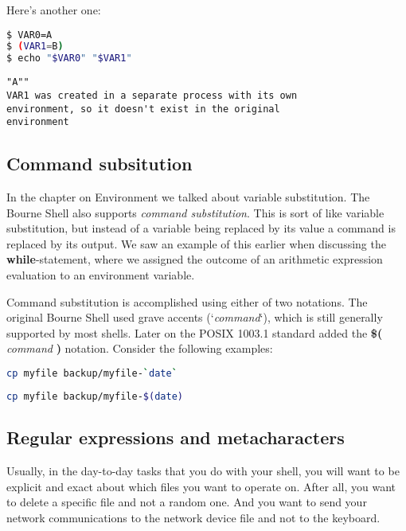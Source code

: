 Here's another one:
\lstset{basicstyle=\scriptsize, numbers=left, captionpos=b, tabsize=4}
\begin{lstlisting}[caption=Creating shell variables in the current and in a new environment,language={bash},
breaklines=true,xleftmargin=15pt,label=lst:Creating shell variables in the current and in a new environment]
$ VAR0=A
$ (VAR1=B)
$ echo "$VAR0" "$VAR1"
\end{lstlisting}

\scriptsize
\begin{verbatim}
"A""
VAR1 was created in a separate process with its own 
environment, so it doesn't exist in the original 
environment
\end{verbatim}
\normalsize

\subsection{Command subsitution}
In the chapter on Environment we talked about variable substitution. The Bourne
Shell also supports \emph{command substitution}. This is sort of like variable
substitution, but instead of a variable being replaced by its value a command
is replaced by its output. We saw an example of this earlier when discussing
the \textbf{while}-statement, where we assigned the outcome of an arithmetic
expression evaluation to an environment variable.

Command substitution is accomplished using either of two notations. The
original Bourne Shell used grave accents (`\emph{command}`), which is still
generally supported by most shells. Later on the POSIX 1003.1 standard added
the \textbf{\$(} \emph{command} \textbf{)} notation. Consider the following
examples:
\lstset{basicstyle=\scriptsize, numbers=left, captionpos=b, tabsize=4}
\begin{lstlisting}[caption=Making a daily backup (old-skool),language={bash},
breaklines=true,xleftmargin=15pt,label=lst:Making a daily backup (old-skool)]
cp myfile backup/myfile-`date`
\end{lstlisting}

\lstset{basicstyle=\scriptsize, numbers=left, captionpos=b, tabsize=4}
\begin{lstlisting}[caption=Making a daily backup (POSIX 1003.1),language={bash},
breaklines=true,xleftmargin=15pt,label=lst:Making a daily backup (POSIX 1003.1)]
cp myfile backup/myfile-$(date)
\end{lstlisting}

\subsection{Regular expressions and metacharacters}
Usually, in the day-to-day tasks that you do with your shell, you will want to
be explicit and exact about which files you want to operate on. After all, you
want to delete a specific file and not a random one. And you want to send your
network communications to the network device file and not to the keyboard.


